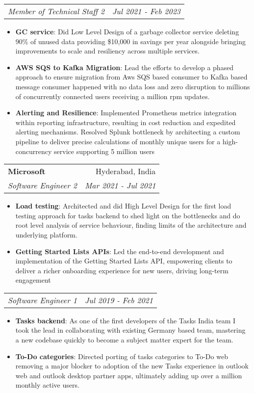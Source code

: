 \documentclass[letterpaper,11pt]{article}
\makeatletter
\newcommand{\resumeItem}[2]{
  \item\small{
    \textbf{#1}{: #2 \vspace{-2pt}}
  }
}
\newcommand{\resumeSubheading}[4]{
  \vspace{-1pt}\item
    \begin{tabular*}{0.97\textwidth}[t]{l@{\extracolsep{\fill}}r}
      \textbf{#1} & #2 \\
      \textit{\small#3} & \textit{\small #4} \\
    \end{tabular*}\vspace{-5pt}
}
\newcommand{\resumeSubSubheading}[2]{
    \begin{tabular*}{0.97\textwidth}{l@{\extracolsep{\fill}}r}
      \textit{\small#1} & \textit{\small #2} \\
    \end{tabular*}\vspace{-5pt}
}
\newcommand{\resumeItemListStart}{\begin{itemize}}
\newcommand{\resumeItemListEnd}{\end{itemize}\vspace{-5pt}}
\makeatother
\begin{document}
    \resumeSubSubheading
    {Member of Technical Staff 2}{Jul 2021 - Feb 2023}
      \resumeItemListStart
        \resumeItem{GC service}
          {Did Low Level Design of a garbage collector service deleting 90\% of unused data providing \$10,000 in savings per year alongside bringing improvements to scale and resiliency across multiple services.}
		    \resumeItem{AWS SQS to Kafka Migration}
          {Lead the efforts to develop a phased approach to ensure migration from Aws SQS based consumer to Kafka based message consumer happened with no data loss and zero disruption to millions of concurrently connected users receiving a million rpm updates.}
        \resumeItem{Alerting and Resilience}
          {Implemented Prometheus metrics integration within reporting infrastructure, resulting in cost reduction and expedited alerting mechanisms. Resolved Splunk bottleneck by architecting a custom pipeline to deliver precise calculations of monthly unique users for a high-concurrency service supporting 5 million users }
     \resumeItemListEnd


    \resumeSubheading
      {Microsoft}{Hyderabad, India}
      {Software Engineer 2}{Mar 2021 - Jul 2021}
      \resumeItemListStart
        \resumeItem{Load testing}
          {Architected and did High Level Design for the first load testing approach for tasks backend to shed light on the bottlenecks and do root level analysis of service behaviour, finding limits of the architecture and underlying platform.}
        \resumeItem{Getting Started Lists APIs}
          {Led the end-to-end development and implementation of the Getting Started Lists API, empowering clients to deliver a richer onboarding experience for new users, driving long-term engagement}
      \resumeItemListEnd

	  \resumeSubSubheading
		{Software Engineer 1}{Jul 2019 - Feb 2021}
		\resumeItemListStart
			\resumeItem{Tasks backend}
			{As one of the first developers of the Tasks India team I took the lead in collaborating with existing Germany based team, mastering a new codebase quickly to become a subject matter expert for the team.}
			\resumeItem{To-Do categories}
			{Directed porting of tasks categories to To-Do web removing a major blocker to adoption of the new Tasks experience in outlook web and outlook desktop partner apps, ultimately adding up over a million monthly active users.}
		\resumeItemListEnd
\end{document}
